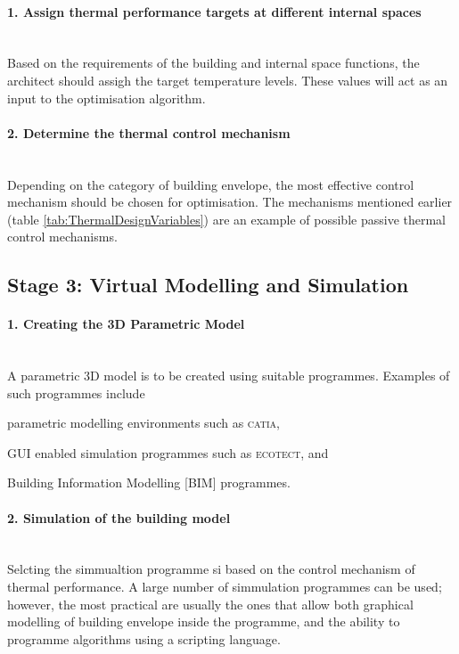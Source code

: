 \documentclass[11pt,a4paper,oneside]{article}
\begin{document}
\begin{multicols}{2}
\paragraph{1. Assign thermal performance targets at different internal spaces}\mbox{}\\

Based on the requirements of the building and internal space functions, the architect should assigh the target temperature levels. These values will act as an input to the optimisation algorithm.

\paragraph{2. Determine the thermal control mechanism}\mbox{}\\

Depending on the category of building envelope, the most effective control mechanism should be chosen for optimisation. The mechanisms mentioned earlier (table \ref{tab:ThermalDesignVariables}) are an example of possible passive thermal control mechanisms.

\subsection*{Stage 3: Virtual Modelling and Simulation}

\paragraph{1. Creating the 3D Parametric Model}\mbox{}\\

A parametric 3D model is to be created using suitable programmes. Examples of such programmes include \begin{inparaenum} \item parametric modelling environments such as \textsc{catia}, \item GUI enabled simulation programmes such as \textsc{ecotect}, and \item Building Information Modelling [BIM] programmes.\end{inparaenum}

\paragraph{2. Simulation of the building model}\mbox{}\\

Selcting the simmualtion programme si based on the control mechanism of thermal performance. A large number of simmulation programmes can be used; however, the most practical are usually the ones that allow both graphical modelling of building envelope inside the programme, and the ability to programme algorithms using a scripting language.


\end{multicols}
\end{document}
